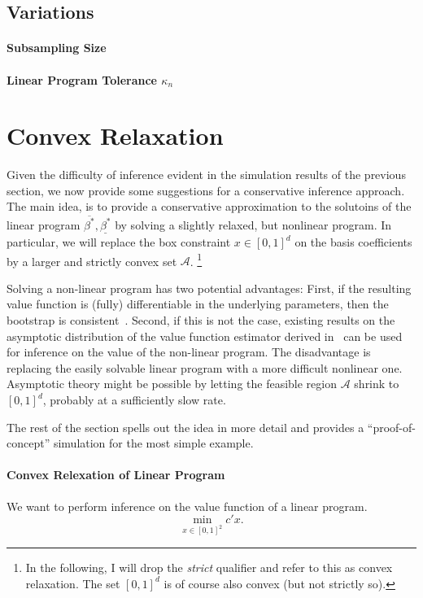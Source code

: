 \documentclass[12pt,a4paper,english]{article} %
\numberwithin{equation}{section}
\theoremstyle{definition}
\theoremstyle{remark}
\theoremstyle{plain}
\begin{document}
\subsection{Variations}

\paragraph{Subsampling Size}


\paragraph{Linear Program Tolerance $\kappa_n$}


\section{Convex Relaxation}
Given the difficulty of inference evident in the simulation results of the previous section, we now provide some suggestions for a conservative inference approach.
The main idea, is to provide a conservative approximation to the solutoins of the linear program $\overline{\beta^*}, \underline{\beta^*}$ by solving a slightly relaxed, but nonlinear program.
In particular, we will replace the box constraint $x\in[0,1]^d$ on the basis coefficients by a larger and strictly convex set $\mathcal{A}$.
\footnote{In the following, I will drop the \textit{strict} qualifier and refer to this as convex relaxation. The set $[0,1]^d$ is of course also convex (but not strictly so).}

Solving a non-linear program has two potential advantages:
First, if the resulting value function is (fully) differentiable in the underlying parameters, then the bootstrap is consistent~\citep{fang2019infdirdiff}.
Second, if this is not the case, existing results on the asymptotic distribution of the value function estimator derived in~\cite{shapiro1991asymptotic} can be used for inference on the value of the non-linear program.
The disadvantage is replacing the easily solvable linear program with a more difficult nonlinear one.
Asymptotic theory might be possible by letting the feasible region $\mathcal{A}$ shrink to $[0,1]^d$, probably at a sufficiently slow rate.

The rest of the section spells out the idea in more detail and provides a ``proof-of-concept'' simulation for the most simple example.

\paragraph{Convex Relexation of Linear Program}
We want to perform inference on the value function of a linear program.
\begin{equation}
	\min_{x\in [0,1]^2} c'x.
\end{equation}
\end{document}
